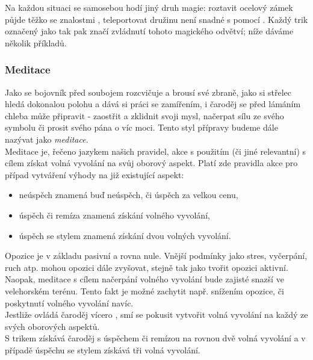 \documentclass[../main.tex]{subfiles}
\begin{document}
Na každou situaci se samosebou hodí jiný druh magie: roztavit ocelový zámek půjde těžko se znalostmi , teleportovat družinu není snadné s pomocí .  Každý trik označený jako  tak pak značí zvládnutí tohoto magického odvětví; níže dáváme několik příkladů. 

\subsubsection*{Meditace}
\label{sec:meditace}

Jako se bojovník před soubojem rozcvičuje a brousí své zbraně, jako si střelec hledá dokonalou polohu a dává si práci se zamířením, i čaroděj se před lámáním chleba může připravit - zaostřit a zklidnit svoji mysl, načerpat sílu ze svého symbolu či prosit svého pána o víc moci. Tento styl přípravy budeme dále nazývat jako \emph{meditace}. \\
Meditace je, řečeno jazykem našich pravidel, akce  s použitím  (či jiné relevantní) s cílem získat volná vyvolání na svůj oborový aspekt. Platí zde pravidla akce   pro případ vytváření výhody na již existující aspekt:

\begin{itemize}
	\item neúspěch znamená buď neúspěch, či úspěch za velkou cenu,
	\item úspěch či remíza znamená získání volného vyvolání,
	\item úspěch se stylem znamená získání dvou volných vyvolání.
\end{itemize}

Opozice je v základu pasivní a rovna nule. Vnější podmínky jako stres, vyčerpání, ruch atp. mohou opozici dále zvyšovat, stejně tak jako tvořit opozici aktivní. Naopak, meditace s cílem načerpání volného vyvolání  bude zajisté snazší ve velehorském terénu. Tento fakt je možné zachytit např. snížením opozice, či poskytnutí volného vyvolání navíc. \\
Jestliže ovládá čaroděj vícero , smí se pokusit vytvořit volná vyvolání na každý ze svých oborových aspektů.\\

S trikem  získává čaroděj s úspěchem či remízou na  rovnou dvě volná vyvolání a v případě úspěchu se stylem získává tři volná vyvolání.
\end{document}
